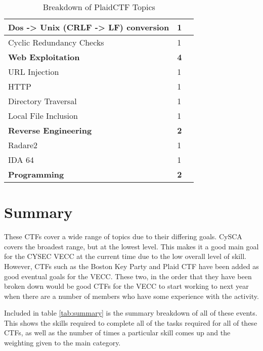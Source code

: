 \documentclass[a4paper,11pt]{report}
\begin{document}
\begin{table}[htb]
\begin{tabular}{| l | l | l |}
				\quad Dos -> Unix (CRLF -> LF) conversion & 1 & \\ \hline 
				\quad Cyclic Redundancy Checks & 1 & \\ \hline
				\textbf{Web Exploitation} & \textbf{4} & \\ \hline
				\quad URL Injection & 1 & \\ \hline
				\quad HTTP & 1 & \\ \hline 
				\quad Directory Traversal & 1 & \\ \hline
				\quad Local File Inclusion & 1 & \\ \hline 
				\textbf{Reverse Engineering} & \textbf{2} & \\ \hline
				\quad Radare2 & 1 & \\ \hline
				\quad IDA 64 & 1 & \\ \hline 
				\textbf{Programming} & \textbf{2} & \\ \hline
			\end{tabular}
			\caption{Breakdown of PlaidCTF Topics}
			\label{tab:PlaidCTF Breakdown}
		\end{table}

\chapter{Summary}
	These CTFs cover a wide range of topics due to their differing goals. 
	CySCA covers the broadest range, but at the lowest level. 
	This makes it a good main goal for the CYSEC VECC at the current time due to the low overall level of skill. 
	However, CTFs such as the Boston Key Party and Plaid CTF have been added as good eventual goals for the VECC. 
	These two, in the order that they have been broken down would be good CTFs for the VECC to start working to next year when there are a number of members who have some experience with the activity. 

	Included in table \ref{tab:summary} is the summary breakdown of all of these events. 
	This shows the skills required to complete all of the tasks required for all of these CTFs, as well as the number of times a particular skill comes up and the weighting given to the main category. 
\end{document}

